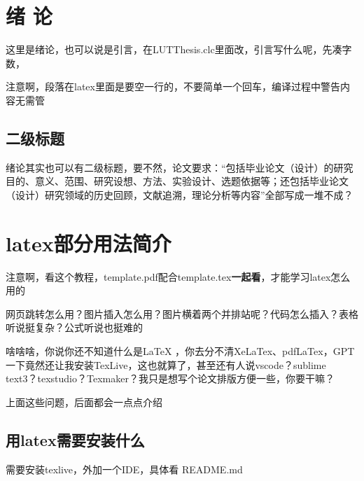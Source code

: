 \documentclass[AutoFakeBold]{LUTThesis}
\begin{document}
\mainmatter

\chapter{\texorpdfstring{绪 \quad 论}{绪论}}


这里是绪论，也可以说是引言，在LUTThesis.clc里面改，引言写什么呢，先凑字数，

注意啊，段落在latex里面是要空一行的，不要简单一个回车，编译过程中警告内容无需管

\section{二级标题}

绪论其实也可以有二级标题，要不然，论文要求：“包括毕业论文（设计）的研究目的、意义、范围、研究设想、方法、实验设计、选题依据等；还包括毕业论文（设计）研究领域的历史回顾，文献追溯，理论分析等内容”全部写成一堆不成？



\chapter{latex部分用法简介}

注意啊，看这个教程，template.pdf配合template.tex\textbf{一起看}，才能学习latex怎么用的

网页跳转怎么用？图片插入怎么用？图片横着两个并排站呢？代码怎么插入？表格听说挺复杂？公式听说也挺难的

啥啥啥，你说你还不知道什么是LaTeX ，你去分不清XeLaTex、pdfLaTex，GPT一下竟然还让我安装TexLive，这也就算了，甚至还有人说vscode？sublime text3？texstudio？Texmaker？我只是想写个论文排版方便一些，你要干嘛？

上面这些问题，后面都会一点点介绍

\section{用latex需要安装什么}

需要安装texlive，外加一个IDE，具体看 README.md
\end{document}

